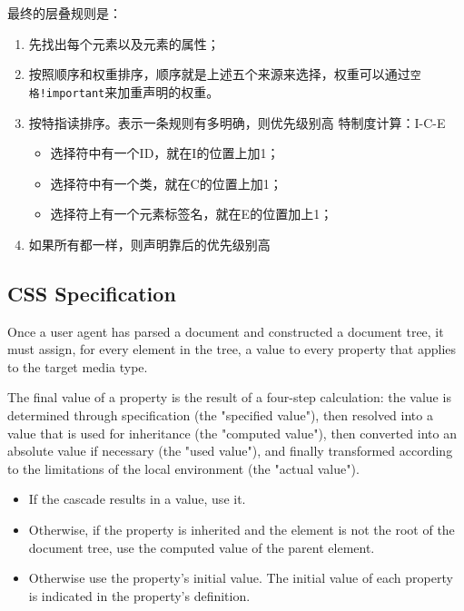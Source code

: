 最终的层叠规则是：
\begin{enumerate}
\item 先找出每个元素以及元素的属性；
\item 按照顺序和权重排序，顺序就是上述五个来源来选择，权重可以通过\lstinline$空格!important$来加重声明的权重。
\item 按特指读排序。表示一条规则有多明确，则优先级别高
特制度计算：I-C-E
\begin{itemize}
\item 选择符中有一个ID，就在I的位置上加1；
\item 选择符中有一个类，就在C的位置上加1；
\item 选择符上有一个元素标签名，就在E的位置加上1；
\end{itemize}
\item 如果所有都一样，则声明靠后的优先级别高
\end{enumerate}




\subsection{CSS Specification}

Once a user agent has parsed a document and constructed a document tree, it must assign, for every element in the tree, a value to every property that applies to the target media type.

The final value of a property is the result of a four-step calculation: the value is determined through specification (the "specified value"), then resolved into a value that is used for inheritance (the "computed value"), then converted into an absolute value if necessary (the "used value"), and finally transformed according to the limitations of the local environment (the "actual value").

\begin{itemize}
\item If the cascade results in a value, use it.
\item Otherwise, if the property is inherited and the element is not the root of the document tree, use the computed value of the parent element. 
\item Otherwise use the property's initial value. The initial value of each property is indicated in the property's definition. 
\end{itemize}

